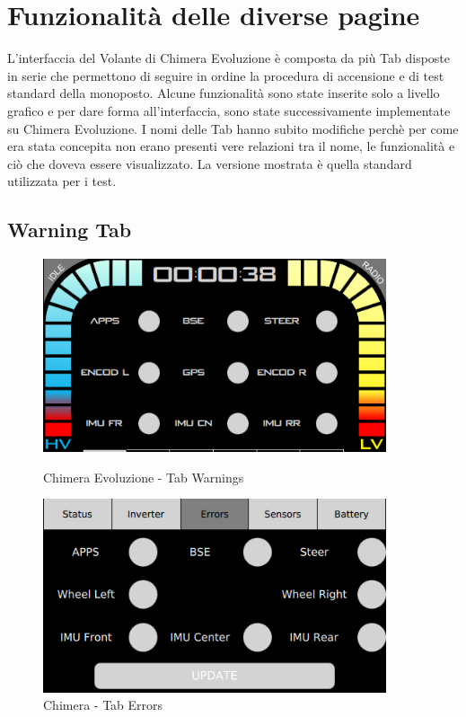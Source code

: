 \newpage






\section{Funzionalità delle diverse pagine}


L'interfaccia del Volante di Chimera Evoluzione è composta da più Tab disposte in serie che permettono di seguire in ordine
la procedura di accensione e di test standard della monoposto. Alcune funzionalità sono state inserite solo a livello grafico
e per dare forma all'interfaccia, sono state successivamente implementate su Chimera Evoluzione. 
I nomi delle Tab hanno subito modifiche perchè per come era stata concepita non erano presenti 
vere relazioni tra il nome, le funzionalità e ciò che doveva essere visualizzato. 
La versione mostrata è quella standard utilizzata per i test. 

\subsection{Warning Tab}

\begin{figure}[h!]
    \centering
    \begin{minipage}{0.5\textwidth}
        \centering
        \includegraphics[width=0.9\textwidth]{./figures/UI/tabWanings.png}
        \caption{Chimera Evoluzione - Tab Warnings}    
    \end{minipage}\hfill
    \begin{minipage}{0.5\textwidth}
        \centering
        \includegraphics[width=0.9\textwidth]{./figures/oldUI/tabErrors.png}
        \caption{Chimera - Tab Errors}
    \end{minipage}
\end{figure}

